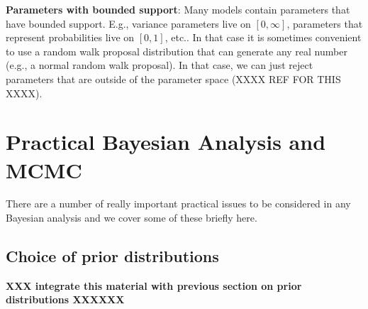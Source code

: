 {\bf Parameters with bounded support}: Many models contain parameters that
have  bounded support. E.g., variance parameters live on $[0,\infty]$,
parameters that represent probabilities live on $[0,1]$, etc..
 In that case it is sometimes convenient to use a random
walk proposal distribution that can generate any real number (e.g., a
normal random walk proposal). In that case, 
we can just reject parameters that are
outside of the parameter space (XXXX REF FOR THIS XXXX). 



\section{Practical Bayesian Analysis and MCMC}

There are a number of really important practical issues to be
considered in any Bayesian analysis and we cover some of these briefly
here.

\subsection{Choice of prior distributions} 

{\bf XXX integrate this material with previous section on prior
distributions XXXXXX}

